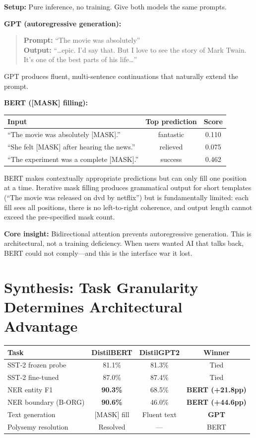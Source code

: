 \textbf{Setup:} Pure inference, no training. Give both models the same prompts.

\textbf{GPT (autoregressive generation):}

\begin{quote}
\textbf{Prompt:} ``The movie was absolutely'' \\
\textbf{Output:} ``\ldots epic. I'd say that. But I love to see the story of Mark Twain. It's one of the best parts of his life\ldots''
\end{quote}

GPT produces fluent, multi-sentence continuations that naturally extend the prompt.

\textbf{BERT ([MASK] filling):}

\begin{center}
\begin{tabular}{lcc}
\toprule
Input & Top prediction & Score \\
\midrule
``The movie was absolutely {[MASK]}.'' & fantastic & 0.110 \\
``She felt {[MASK]} after hearing the news.'' & relieved & 0.075 \\
``The experiment was a complete {[MASK]}.'' & success & 0.462 \\
\bottomrule
\end{tabular}
\end{center}

BERT makes contextually appropriate predictions but can only fill one position at a time. Iterative mask filling produces grammatical output for short templates (``The movie was released on dvd by netflix'') but is fundamentally limited: each fill sees all positions, there is no left-to-right coherence, and output length cannot exceed the pre-specified mask count.

\textbf{Core insight:} Bidirectional attention prevents autoregressive generation. This is architectural, not a training deficiency. When users wanted AI that talks back, BERT could not comply---and this is the interface war it lost.


\section{Synthesis: Task Granularity Determines Architectural Advantage}

\begin{center}
\begin{tabular}{lccc}
\toprule
Task & DistilBERT & DistilGPT2 & Winner \\
\midrule
SST-2 frozen probe & 81.1\% & 81.3\% & Tied \\
SST-2 fine-tuned & 87.0\% & 87.4\% & Tied \\
NER entity F1 & \textbf{90.3\%} & 68.5\% & \textbf{BERT (+21.8pp)} \\
NER boundary (B-ORG) & \textbf{90.6\%} & 46.0\% & \textbf{BERT (+44.6pp)} \\
Text generation & {[MASK]} fill & Fluent text & \textbf{GPT} \\
Polysemy resolution & Resolved & --- & BERT \\
\bottomrule
\end{tabular}
\end{center}

